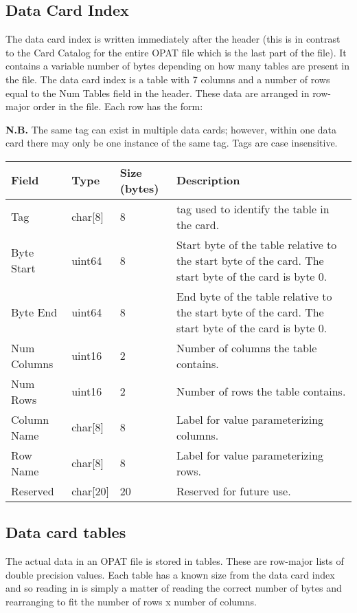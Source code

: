 \documentclass{article}
\begin{document}
\subsection{Data Card Index}
The data card index is written immediately after the header (this is in contrast
to the Card Catalog for the entire OPAT file which is the last part of the
file).  It contains a variable number of bytes depending on how many tables are
present in the file.  The data card index is a table with 7 columns and a
number of rows equal to the Num Tables field in the header.  These data are
arranged in row-major order in the file.  Each row has the form: 

\noindent\textbf{N.B.} The same tag can exist in multiple data cards;  however,
within one data card there may only be one instance of the same tag.  Tags are
case insensitive. 
\begin{longtable}{|l|l|l|p{5cm}|}
\hline
\textbf{Field} & \textbf{Type} & \textbf{Size (bytes)} & \textbf{Description} \\
\hline
  Tag & char[8] & 8 & tag used to identify the table in the card.  \\
  Byte Start & uint64 & 8 & Start byte of the table relative to the start byte of the card.  The start byte of the card is byte 0.  \\
  Byte End & uint64 & 8 & End byte of the table relative to the start byte of the card.  The start byte of the card is byte 0.  \\
  Num Columns & uint16 & 2 & Number of columns the table contains.  \\
  Num Rows & uint16 & 2 & Number of rows the table contains.  \\
  Column Name & char[8] & 8 & Label for value parameterizing columns.  \\
  Row Name & char[8] & 8 & Label for value parameterizing rows.  \\
  Reserved & char[20] & 20 & Reserved for future use.  \\
\hline
\end{longtable}

\subsection{Data card tables}
The actual data in an OPAT file is stored in tables.  These are row-major lists
of double precision values.  Each table has a known size from the data card
index and so reading in is simply a matter of reading the correct number of
bytes and rearranging to fit the number of rows x number of columns. 
\end{document}
